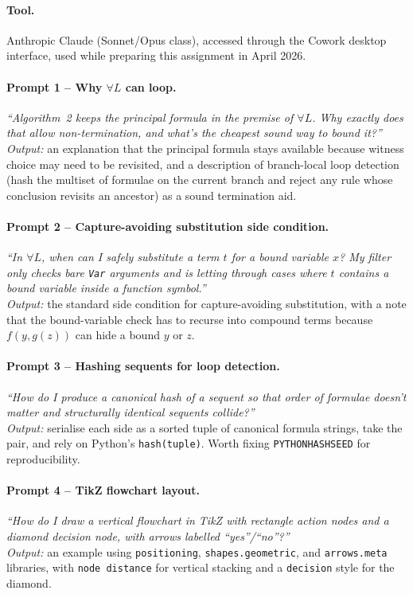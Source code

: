 \paragraph{Tool.}
Anthropic Claude (Sonnet/Opus class), accessed through the Cowork desktop
interface, used while preparing this assignment in April 2026.

\paragraph{Prompt 1 -- Why $\forall L$ can loop.}
\textit{``Algorithm~2 keeps the principal formula in the premise of
$\forall L$. Why exactly does that allow non-termination, and what's the
cheapest sound way to bound it?''}
\\\textit{Output:} an explanation that the principal formula stays
available because witness choice may need to be revisited, and a
description of branch-local loop detection (hash the multiset of
formulae on the current branch and reject any rule whose conclusion
revisits an ancestor) as a sound termination aid.

\paragraph{Prompt 2 -- Capture-avoiding substitution side condition.}
\textit{``In $\forall L$, when can I safely substitute a term $t$ for a
bound variable $x$? My filter only checks bare \texttt{Var} arguments
and is letting through cases where $t$ contains a bound variable inside
a function symbol.''}
\\\textit{Output:} the standard side condition for capture-avoiding
substitution, with a note that the bound-variable check has to recurse
into compound terms because $f(y, g(z))$ can hide a bound $y$ or $z$.

\paragraph{Prompt 3 -- Hashing sequents for loop detection.}
\textit{``How do I produce a canonical hash of a sequent so that order of
formulae doesn't matter and structurally identical sequents collide?''}
\\\textit{Output:} serialise each side as a sorted tuple of canonical
formula strings, take the pair, and rely on Python's
\texttt{hash(tuple)}. Worth fixing \texttt{PYTHONHASHSEED} for
reproducibility.

\paragraph{Prompt 4 -- TikZ flowchart layout.}
\textit{``How do I draw a vertical flowchart in TikZ with rectangle
action nodes and a diamond decision node, with arrows labelled
``yes''/``no''?''}
\\\textit{Output:} an example using \texttt{positioning},
\texttt{shapes.geometric}, and \texttt{arrows.meta} libraries, with
\texttt{node distance} for vertical stacking and a \texttt{decision}
style for the diamond.

